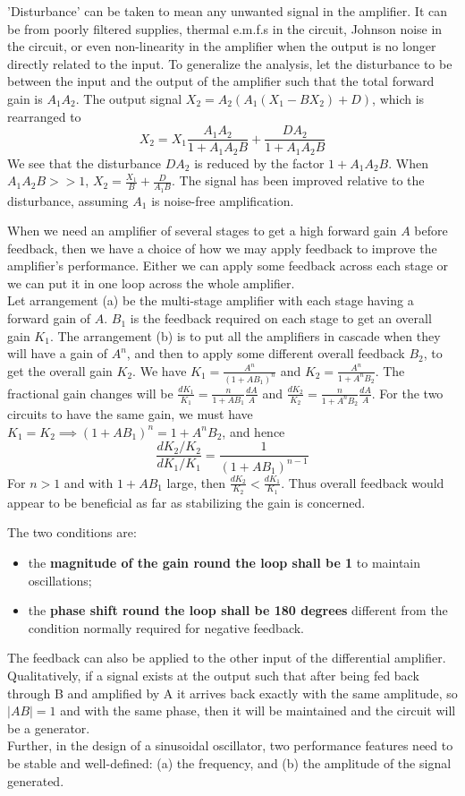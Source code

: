 \documentclass[a4paper]{article}
\begin{document}
\begin{Note}
'Disturbance' can be taken to mean any unwanted signal in the amplifier. It can be from poorly filtered supplies, thermal e.m.f.s in the circuit, Johnson noise in the circuit, or even non-linearity in the amplifier when the output is no longer directly related to the input. To generalize the analysis, let the disturbance to be between the input and the output of the amplifier such that the total forward gain is $A_1A_2$. The output signal $X_2=A_2(A_1(X_1-BX_2)+D)$, which is rearranged to
$$X_2=X_1\frac{A_1A_2}{1+A_1A_2B}+\frac{DA_2}{1+A_1A_2B}$$
We see that the disturbance $DA_2$ is reduced by the factor $1+A_1A_2B$. When $A_1A_2B>>1$, $X_2=\frac{X_1}{B}+\frac{D}{A_1B}$. The signal has been improved relative to the disturbance, assuming $A_1$ is noise-free amplification.
\end{Note}
\begin{eg}
When we need an amplifier of several stages to get a high forward gain $A$ before feedback, then we have a choice of how we may apply feedback to improve the amplifier's performance. Either we can apply some feedback across each stage or we can put it in one loop across the whole amplifier.\\[5pt]
Let arrangement (a) be the multi-stage amplifier with each stage having a forward gain of $A$. $B_1$ is the feedback required on each stage to get an overall gain $K_1$. The arrangement (b) is to put all the amplifiers in cascade when they will have a gain of $A^n$, and then to apply some different overall feedback $B_2$, to get the overall gain $K_2$. We have $K_1=\frac{A^n}{(1+AB_1)^n}$ and $K_2=\frac{A^n}{1+A^nB_2}$. The fractional gain changes will be $\frac{dK_1}{K_1}=\frac{n}{1+AB_1}\frac{dA}{A}$ and $\frac{dK_2}{K_2}=\frac{n}{1+A^nB_2}\frac{dA}{A}$. For the two circuits to have the same gain, we must have $K_1=K_2\implies(1+AB_1)^n=1+A^nB_2$, and hence
$$\frac{dK_2/K_2}{dK_1/K_1}=\frac{1}{(1+AB_1)^{n-1}}$$
For $n>1$ and with $1+AB_1$ large, then $\frac{dK_2}{K_2}<\frac{dK_1}{K_1}$. Thus overall feedback would appear to be beneficial as far as stabilizing the gain is concerned.
\end{eg}
\begin{Note}
The two conditions are:
\begin{itemize}
    \item the \textbf{magnitude of the gain round the loop shall be 1} to maintain oscillations;
    \item the \textbf{phase shift round the loop shall be 180 degrees} different from the condition normally required for negative feedback.
\end{itemize}
The feedback can also be applied to the other input of the differential amplifier. Qualitatively, if a signal exists at the output such that after being fed back through B and amplified by A it arrives back exactly with the same amplitude, so $|AB|=1$ and with the same phase, then it will be maintained and the circuit will be a generator.\\[5pt]
Further, in the design of a sinusoidal oscillator, two performance features need to be stable and well-defined: (a) the frequency, and (b) the amplitude of the signal generated.
\end{Note}
\end{document}
